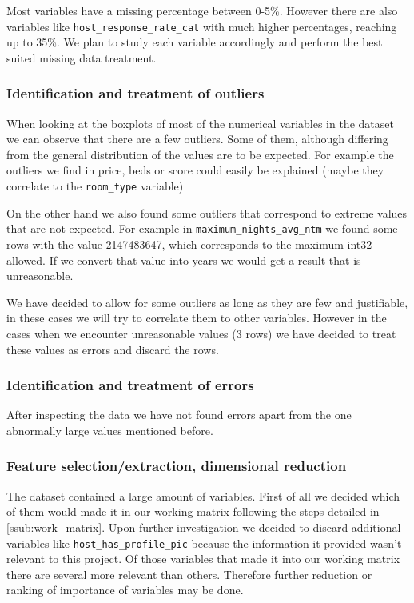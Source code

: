 Most variables have a missing percentage between 0-5\%. However there are also
variables like \texttt{host\_response\_rate\_cat} with much higher percentages,
reaching up to 35\%.  We plan to study each variable accordingly and perform the
best suited missing data treatment.

\subsubsection{Identification and treatment of outliers}

When looking at the boxplots of most of the numerical variables in the dataset
we can observe that there are a few outliers. Some of them, although differing
from the general distribution of the values are to be expected. For example the
outliers we find in price, beds or score could easily be explained (maybe they
correlate to the \texttt{room\_type} variable)

On the other hand we also found some outliers that correspond to extreme values
that are not expected. For example in \texttt{maximum\_nights\_avg\_ntm} we
found some rows with the value 2147483647, which corresponds to the maximum
int32 allowed. If we convert that value into years we would get a result that is
unreasonable.

We have decided to allow for some outliers as long as they are few and
justifiable, in these cases we will try to correlate them to other variables.
However in the cases when we encounter unreasonable values (3 rows) we have
decided to treat these values as errors and discard the rows.

\subsubsection{Identification and treatment of errors}

After inspecting the data we have not found errors apart from the one abnormally
large values mentioned before.

\subsubsection{Feature selection/extraction, dimensional reduction}

The \airbnb dataset contained a large amount of variables. First of all we
decided which of them would made it in our working matrix following the steps
detailed in \ref{ssub:work_matrix}. Upon further investigation we decided to
discard additional variables like \texttt{host\_has\_profile\_pic} because the
information it provided wasn't relevant to this project. Of those variables that
made it into our working matrix there are several more relevant than others.
Therefore further reduction or ranking of importance of variables may be done.

